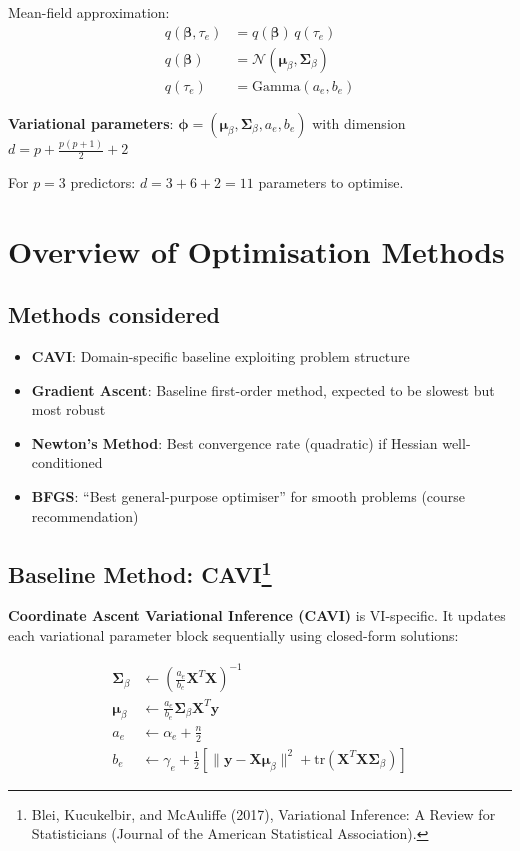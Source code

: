 \documentclass[11pt]{article}
\newcommand{\N}{\mathcal{N}}
\newcommand{\tr}{\text{tr}}
\begin{document}
Mean-field approximation:
\begin{align}
q(\bm{\beta}, \tau_e) &= q(\bm{\beta}) \, q(\tau_e)\\
q(\bm{\beta}) &= \N(\bm{\mu}_\beta, \bm{\Sigma}_\beta)\\
q(\tau_e) &= \text{Gamma}(a_e, b_e)
\end{align}

\textbf{Variational parameters}: $\bm{\phi} = (\bm{\mu}_\beta, \bm{\Sigma}_\beta, a_e, b_e)$ with dimension $d = p + \frac{p(p+1)}{2} + 2$

For $p=3$ predictors: $d = 3 + 6 + 2 = 11$ parameters to optimise.
 
\section*{Overview of Optimisation Methods}

\subsection*{Methods considered}

\begin{itemize}
\item \textbf{CAVI}: Domain-specific baseline exploiting problem structure
\item \textbf{Gradient Ascent}: Baseline first-order method, expected to be slowest but most robust
\item \textbf{Newton's Method}: Best convergence rate (quadratic) if Hessian well-conditioned
\item \textbf{BFGS}: ``Best general-purpose optimiser'' for smooth problems (course recommendation)
\end{itemize}

\subsection*{Baseline Method: CAVI\footnote{Blei, Kucukelbir, and McAuliffe (2017), Variational Inference: A Review for Statisticians (Journal of the American Statistical Association).}}

\textbf{Coordinate Ascent Variational Inference (CAVI)} is VI-specific. It updates each variational parameter block sequentially using closed-form solutions:

\begin{align}
\bm{\Sigma}_\beta &\leftarrow \left(\frac{a_e}{b_e} \bm{X}^T\bm{X}\right)^{-1}\\
\bm{\mu}_\beta &\leftarrow \frac{a_e}{b_e} \bm{\Sigma}_\beta \bm{X}^T\bm{y}\\
a_e &\leftarrow \alpha_e + \frac{n}{2}\\
b_e &\leftarrow \gamma_e + \frac{1}{2}\left[\|\bm{y} - \bm{X}\bm{\mu}_\beta\|^2 + \tr(\bm{X}^T\bm{X}\bm{\Sigma}_\beta)\right]
\end{align}
\end{document}
